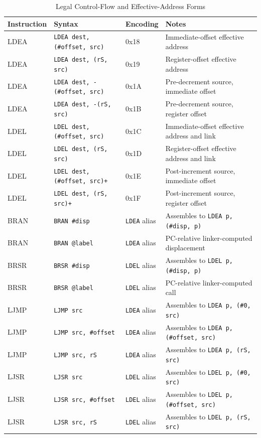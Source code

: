 \begin{table}[H]
	\centering
	\scriptsize
	\begin{tabular}{llll}
		\toprule
		\textbf{Instruction} & \textbf{Syntax} & \textbf{Encoding} & \textbf{Notes} \\
		\midrule
		LDEA & \texttt{LDEA dest, (\#offset, src)} & 0x18 & Immediate-offset effective address \\
		LDEA & \texttt{LDEA dest, (rS, src)} & 0x19 & Register-offset effective address \\
		LDEA & \texttt{LDEA dest, -(\#offset, src)} & 0x1A & Pre-decrement source, immediate offset \\
		LDEA & \texttt{LDEA dest, -(rS, src)} & 0x1B & Pre-decrement source, register offset \\
		LDEL & \texttt{LDEL dest, (\#offset, src)} & 0x1C & Immediate-offset effective address and link \\
		LDEL & \texttt{LDEL dest, (rS, src)} & 0x1D & Register-offset effective address and link \\
		LDEL & \texttt{LDEL dest, (\#offset, src)+} & 0x1E & Post-increment source, immediate offset \\
		LDEL & \texttt{LDEL dest, (rS, src)+} & 0x1F & Post-increment source, register offset \\
		BRAN & \texttt{BRAN \#disp} & \texttt{LDEA} alias & Assembles to \texttt{LDEA p, (\#disp, p)} \\
		BRAN & \texttt{BRAN @label} & \texttt{LDEA} alias & PC-relative linker-computed displacement \\
		BRSR & \texttt{BRSR \#disp} & \texttt{LDEL} alias & Assembles to \texttt{LDEL p, (\#disp, p)} \\
		BRSR & \texttt{BRSR @label} & \texttt{LDEL} alias & PC-relative linker-computed call \\
		LJMP & \texttt{LJMP src} & \texttt{LDEA} alias & Assembles to \texttt{LDEA p, (\#0, src)} \\
		LJMP & \texttt{LJMP src, \#offset} & \texttt{LDEA} alias & Assembles to \texttt{LDEA p, (\#offset, src)} \\
		LJMP & \texttt{LJMP src, rS} & \texttt{LDEA} alias & Assembles to \texttt{LDEA p, (rS, src)} \\
		LJSR & \texttt{LJSR src} & \texttt{LDEL} alias & Assembles to \texttt{LDEL p, (\#0, src)} \\
		LJSR & \texttt{LJSR src, \#offset} & \texttt{LDEL} alias & Assembles to \texttt{LDEL p, (\#offset, src)} \\
		LJSR & \texttt{LJSR src, rS} & \texttt{LDEL} alias & Assembles to \texttt{LDEL p, (rS, src)} \\
		\bottomrule
	\end{tabular}
	\caption{Legal Control-Flow and Effective-Address Forms}
	\label{tab:control-flow-legal-forms}
\end{table}

